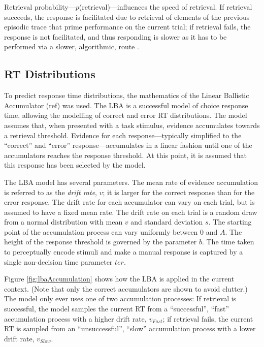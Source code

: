 \documentclass[a4paper, jou, natbib]{apa6}
\begin{document}
Retrieval probability---$p$(retrieval)---influences the speed of retrieval. If retrieval succeeds, the response is facilitated due to retrieval of elements of the previous episodic trace that prime performance on the current trial; if retrieval fails, the response is not facilitated, and thus responding is slower as it has to be performed via a slower, algorithmic, route \citep[see][for discussion]{Grange2015}.

\subsection{RT Distributions}
To predict response time distributions, the mathematics of the Linear Ballistic Accumulator (ref) was used. The LBA is a successful model of choice response time, allowing the modelling of correct and error RT distributions. The model assumes that, when presented with a task stimulus, evidence accumulates towards a retrieval threshold. Evidence for each response---typically simplified to the ``correct'' and ``error'' response---accumulates in a linear fashion until one of the accumulators reaches the response threshold. At this point, it is assumed that this response has been selected by the model. 

The LBA model has several parameters. The mean rate of evidence accumulation is referred to as the \emph{drift rate}, $v$; it is larger for the correct response than for the error response. The drift rate for each accumulator can vary on each trial, but is assumed to have a fixed mean rate. The drift rate on each trial is a random draw from a normal distribution with mean $v$ and standard deviation $s$. The starting point of the accumulation process can vary uniformly between 0 and $A$. The height of the response threshold is governed by the parameter $b$. The time taken to perceptually encode stimuli and make a manual response is captured by a single non-decision time parameter $ter$. 

Figure \ref{fig:lbaAccumulation} shows how the LBA is applied in the current context. (Note that only the correct accumulators are shown to avoid clutter.) The model only ever uses one of two accumulation processes: If retrieval is successful, the model samples the current RT from a ``successful'', ``fast'' accumulation process with a higher drift rate, $v_{Fast}$; if retrieval fails, the current RT is sampled from an ``unsuccessful'', ``slow'' accumulation process with a lower drift rate, $v_{Slow}$. 
\end{document}
